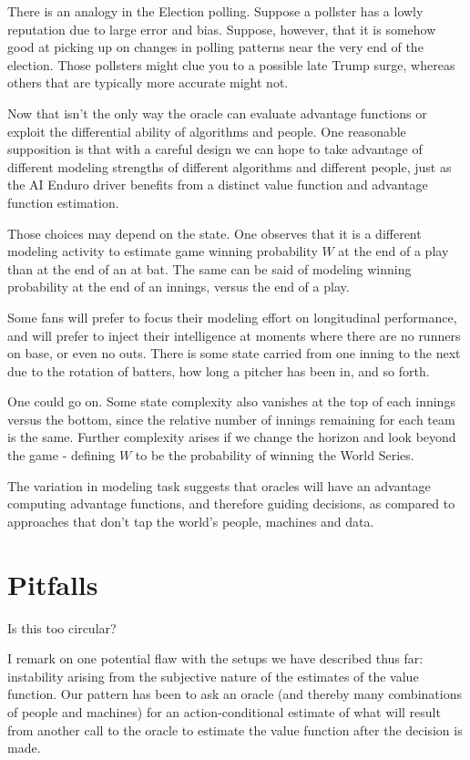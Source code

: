 There is an analogy in the Election polling. Suppose a pollster has a lowly reputation due to large error and bias. Suppose, however, that it is somehow good at picking up on changes in polling patterns near the very end of the election. Those pollsters might clue you to a possible late Trump surge, whereas others that are typically more accurate might not.

Now that isn't the only way the oracle can evaluate advantage functions or exploit the differential ability of algorithms and people. One reasonable supposition is that with a careful design we can hope to take advantage of different modeling strengths of different algorithms and different people, just as the AI Enduro driver benefits from a distinct value function and advantage function estimation. 

Those choices may depend on the state. One observes that it is a different modeling activity to estimate game winning probability $W$ at the end of a play than at the end of an at bat. The same can be said of modeling winning probability at the end of an innings, versus the end of a play. 

Some fans will prefer to focus their modeling effort on longitudinal performance, and will prefer to inject their intelligence at moments where there are no runners on base, or even no outs. There is some state carried from one inning to the next due to the rotation of batters, how long a pitcher has been in, and so forth.

One could go on. Some state complexity also vanishes at the top of each innings versus the bottom, since the relative number of innings remaining for each team is the same. Further complexity arises if we change the horizon and look beyond the game - defining $W$ to be the probability of winning the World Series.

The variation in modeling task suggests that oracles will have an advantage computing advantage functions, and therefore guiding decisions, as compared to approaches that don't tap the world's people, machines and data. 

\section{Pitfalls}
\label{sec:temporal}

Is this too circular? 

I remark on one potential flaw with the setups we have described thus far: instability arising from the subjective nature of the estimates of the value function. Our pattern has been to ask an oracle (and thereby many combinations of people and machines) for an action-conditional estimate of what will result from another call to the oracle to estimate the value function after the decision is made. 

